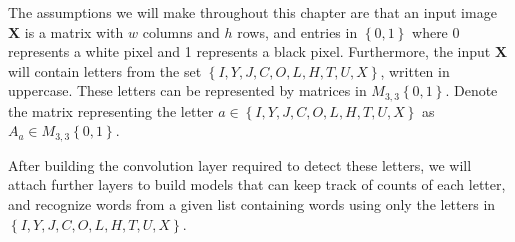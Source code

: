 \documentclass{somasmsc}
\begin{document}
The assumptions we will make throughout this chapter are that an input image $\mathbf{X}$ is a matrix with $w$ columns and $h$ rows, and entries in $\left\{0,1\right\}$ where 0 represents a white pixel and 1 represents a black pixel. Furthermore, the input $\mathbf{X}$ will contain letters from the set $\left\{I, Y, J, C, O, L, H, T, U, X\right\}$, written in uppercase. These letters can be represented by matrices in $M_{3,3}\left\{0,1\right\}$. Denote the matrix representing the letter $a \in \left\{I, Y, J, C, O, L, H, T, U, X\right\}$ as $A_a \in M_{3,3}\left\{0,1\right\}$.

After building the convolution layer required to detect these letters, we will attach further layers to build models that can keep track of counts of each letter, and recognize words from a given list containing words using only the letters in $\left\{I, Y, J, C, O, L, H, T, U, X\right\}$.
\end{document}
